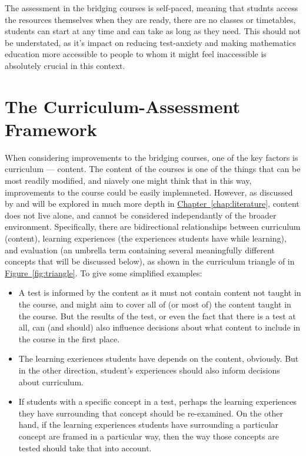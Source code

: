 \documentclass[twoside,12pt,a4paper]{report}
\newcommand{\refchap}[1]{\hyperref[chap:#1]{Chapter~\ref{chap:#1}}}
\newcommand{\reffig}[1]{\hyperref[fig:#1]{Figure~\ref{fig:#1}}}
\begin{document}
The assessment in the bridging courses is self-paced, meaning that studnts access the resources themselves when they are ready, there are no classes or timetables, students can start at any time and can take as long as they need. This should not be understated, as it's impact on reducing test-anxiety and making mathematics education more accessible to people to whom it might feel inaccessible is absolutely crucial in this context.



\section{The Curriculum-Assessment Framework}
\label{sec:framework}

When considering improvements to the bridging courses, one of the key factors is curriculum --- content. The content of the courses is one of the things that can be most readily modified, and niavely one might think that in this way, improvements to the course could be easily implemneted. However, as discussed by \cite{Mohandas2003} and will be explored in much more depth in \refchap{literature}, content does not live alone, and cannot be considered independantly of the broader environment. Specifically, there are bidirectional relationships between curriculum (content), learning experiences (the experiences students have while learning), and evaluation (an umbrella term containing several meaningfully different concepts that will be discussed below), as shown in the curriculum triangle of  in \reffig{triangle}. To give some simplified examples: 
\begin{itemize}
	\item A test is informed by the content as it must not contain content not taught in the course, and might aim to cover all of (or most of) the content taught in the course. But the results of the test, or even the fact that there is a test at all, can (and should) also influence decisions about what content to include in the course in the first place.
	\item The learning exeriences students have depends on the content, obviously. But in the other direction, student's experiences should also inform decisions about curriculum. 
	\item If students 
 with a specific concept in a test, perhaps the learning experiences they have surrounding that concept should be re-examined. On the other hand, if the learning experiences students have surrounding a particular concept are framed in a particular way, then the way those concepts are tested should take that into account.
\end{itemize}
\end{document}
